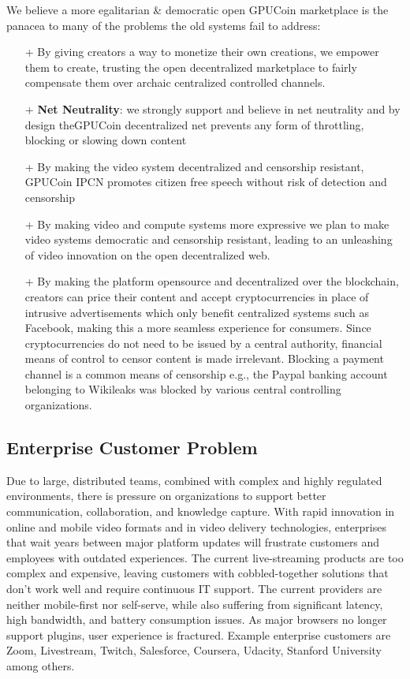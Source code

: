 \documentclass{article}
\begin{document}
We believe a more egalitarian \& democratic open GPUCoin marketplace is the panacea to many of the problems the old systems fail to address:
\begin{itemize}
\item[+]By giving creators a way to monetize their own creations, we empower them to create, trusting the open decentralized marketplace to fairly compensate them over archaic centralized controlled channels.
\item[+]\textbf{Net Neutrality}: we strongly support and believe in net neutrality and by design theGPUCoin decentralized net prevents any form of throttling, blocking or slowing down content
\item[+]By making the video system decentralized and censorship resistant, GPUCoin IPCN promotes citizen free speech without risk of detection and censorship
\item[+]By making video and compute systems more expressive we plan to make video systems democratic and censorship resistant, leading to an unleashing of video innovation on the open decentralized web.

\item[+]By making the platform opensource and decentralized over the blockchain, creators can price their content and accept cryptocurrencies in place of intrusive advertisements which only benefit centralized systems such as Facebook, making this a more seamless experience for consumers. Since cryptocurrencies do not need to be issued by a central authority, financial means of control to censor content is made irrelevant. Blocking a payment channel is a common means of censorship e.g., the Paypal banking account belonging to Wikileaks was blocked by various central controlling organizations.
\end{itemize}



\subsection{Enterprise Customer Problem}
Due to large, distributed teams, combined with complex and highly regulated environments, there is pressure on organizations to support better communication, collaboration, and knowledge capture. With rapid innovation in online and mobile video formats and in video delivery technologies, enterprises that wait years between major platform updates will frustrate customers and employees with outdated experiences. The current live-streaming products are too complex and expensive, leaving customers with cobbled-together solutions that don’t work well and require continuous IT support. The current providers are neither mobile-first nor self-serve, while also suffering from significant latency, high bandwidth, and battery consumption issues. As major browsers no longer support plugins, user experience is fractured. Example enterprise customers are Zoom, Livestream, Twitch, Salesforce, Coursera, Udacity, Stanford University among others.
\end{document}
